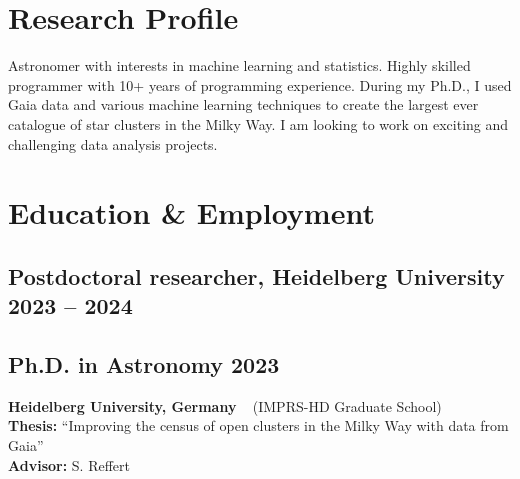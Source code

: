\documentclass[12pt, letterpaper]{hunt-cv}
\begin{document}
\thispagestyle{plain}  %

\cvTitle

\section*{Research Profile}

Astronomer with interests in machine learning and statistics. Highly skilled programmer with 10+ years of programming experience. During my Ph.D., I used Gaia data and various machine learning techniques to create the largest ever catalogue of star clusters in the Milky Way. I am looking to work on exciting and challenging data analysis projects.






\section*{Education \& Employment}

\subsection*{Postdoctoral researcher, Heidelberg University \hfill 2023 -- 2024}\vspace{0.3cm}

\subsection*{Ph.D. in Astronomy \hfill 2023}
\begin{addmargin}[1em]{0em}
    \textbf{Heidelberg University, Germany} ~ (IMPRS-HD Graduate School)\\
    \textbf{Thesis:} ``Improving the census of open clusters in the Milky Way with data from Gaia''\\
    \textbf{Advisor:} S. Reffert
\end{addmargin}
\end{document}
